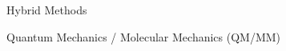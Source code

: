 \begin{frame}{Hybrid Methods}
    \begin{block}{Quantum Mechanics / Molecular Mechanics (QM/MM)}
    \end{block}
\end{frame}
